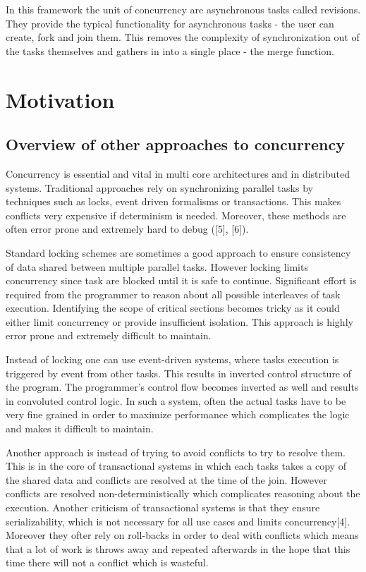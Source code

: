 \documentclass[12pt,twoside,notitlepage]{report}
\begin{document}
In this framework the unit of concurrency are asynchronous tasks called revisions. They provide the typical functionality for asynchronous tasks - the user can create, fork and join them. This removes the complexity of synchronization out of the tasks themselves and gathers in into a single place - the merge function. 

\section{Motivation}

\subsection{Overview of other approaches to concurrency}
 
Concurrency is essential and vital in multi core architectures and in distributed systems. Traditional approaches rely on synchronizing parallel tasks by techniques such as locks, event driven formalisms or transactions. This makes conflicts very expensive if determinism is needed. Moreover, these methods are often error prone and extremely hard to debug ([5], [6]).

Standard locking schemes are sometimes a good approach to ensure consistency of data shared between multiple parallel tasks. However locking limits concurrency since task are blocked until it is safe to continue. Significant effort is required from the programmer to reason about all possible interleaves of task execution. Identifying the scope of critical sections becomes tricky as it could either limit concurrency or provide insufficient isolation. This approach is highly error prone and extremely difficult to maintain.

Instead of locking one can use event-driven systems, where tasks execution is triggered by event from other tasks.  This results in inverted control structure of the program. The programmer's control flow becomes inverted as well and results in convoluted control logic. In such a system, often the actual tasks have to be very fine grained in order to maximize performance which complicates the logic and makes it difficult to maintain.

Another approach is instead of trying to avoid conflicts to try to resolve them. This is in the core of transactional systems in which each tasks takes a copy of the shared data and conflicts are resolved at the time of the join. However conflicts are resolved non-deterministically which complicates reasoning about the execution. Another criticism of transactional systems is that they ensure serializability, which is not necessary for all use cases and limits concurrency[4]. Moreover they ofter rely on roll-backs in order to deal with conflicts which means that a lot of work is throws away and repeated afterwards in the hope that this time there will not a conflict which is wasteful.   
\end{document}
